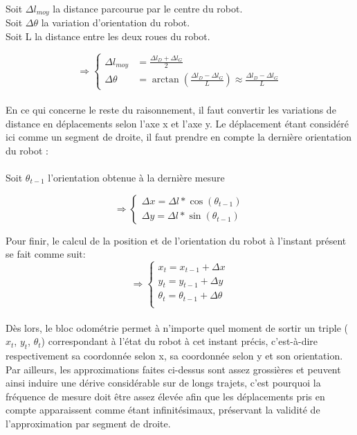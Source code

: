 \documentclass[a4paper,11pt]{article}
\begin{document}
\noindent Soit $\Delta l_{moy}$ la distance parcourue par le centre du robot.\\
Soit $\Delta\theta$ la variation d'orientation du robot.\\
Soit L la distance entre les deux roues du robot.

\begin{equation*}
    \Rightarrow\left\{
      \begin{aligned}
        \Delta l_{moy}  & =\frac{\Delta l_{D}+\Delta l_{G}}{2}\\
        \Delta\theta  & = \arctan(\frac{\Delta l_{D}-\Delta l_{G}}{L}) \approx \frac{\Delta l_{D}-\Delta l_{G}}{L}
        \end{aligned}
    \right.
\end{equation*}\\
En ce qui concerne le reste du raisonnement, il faut convertir les variations de distance en déplacements selon l'axe x et l'axe y. Le déplacement étant considéré ici comme un segment de droite, il faut prendre en compte la dernière orientation du robot \cite{noauthor_robotics:odometrie_2014}:\\\\
Soit $\theta_{t-1}$ l'orientation obtenue à la dernière mesure

\begin{equation*}
    \Rightarrow\left\{
      \begin{aligned}
        \Delta x = \Delta l*\cos(\theta_{t-1})\\
        \Delta y = \Delta l*\sin(\theta_{t-1})
        \end{aligned}
    \right.
\end{equation*}

Pour finir, le calcul de la position et de l'orientation du robot à l'instant présent se fait comme suit:
\begin{equation*}
    \Rightarrow\left\{
      \begin{aligned}
        x_{t} = x_{t-1} + \Delta x\\
        y_{t} = y_{t-1} + \Delta y\\
        \theta_{t} = \theta_{t-1} + \Delta\theta\\
        \end{aligned}
    \right.
\end{equation*}\\

Dès lors, le bloc odométrie permet à n'importe quel moment de sortir un triple ($x_{t}$, $y_{t}$, $\theta_{t}$) correspondant à l'état du robot à cet instant précis, c'est-à-dire respectivement sa coordonnée selon x, sa coordonnée selon y et son orientation. Par ailleurs, les approximations faites ci-dessus sont assez grossières et peuvent ainsi induire une dérive considérable sur de longs trajets, c'est pourquoi la fréquence de mesure doit être assez élevée afin que les déplacements pris en compte apparaissent comme étant infinitésimaux, préservant la validité de l'approximation par segment de droite.
\clearpage
\end{document}
